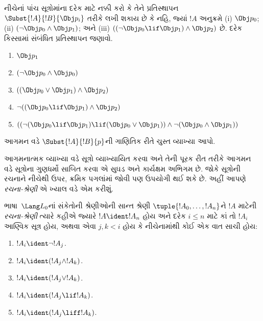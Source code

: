 \begin{prob} નીચેનાં પાંચ સૂત્રોમાંના દરેક માટે નક્કી કરો કે
 તેને પ્રતિસ્થાપન \( \Subst{!A}{!B}{\Obj p_i} \) તરીકે લખી શકાય છે કે નહિ,
 જ્યાં \( !A \) અનુક્રમે (i) \( \Obj p_0 \); (ii) \( ( \lnot \Obj p_0 \land \Obj
 p_1) \); અને (iii) \( ( ( \lnot \Obj p_0 \lif \Obj p_1 ) \land \Obj
 p_2 ) \) છે. દરેક કિસ્સામાં સંબંધિત પ્રતિસ્થાપન જણાવો.
  \begin{enumerate}
    \item \( \Obj p_1 \)
    \item \( ( \lnot \Obj p_0 \land \Obj p_0 ) \)
    \item \( ( ( \Obj p_0 \lor \Obj p_1 ) \land \Obj p_2 )  \)
    \item \( \lnot ( ( \Obj p_0 \lif \Obj p_1 ) \land \Obj p_2 ) \)
    \item \( (( \lnot ( \Obj p_0 \lif \Obj p_1 ) \lif ( \Obj p_0 \lor \Obj p_1 )) \land \lnot ( \Obj p_0 \land \Obj p_1 )) \)
  \end{enumerate}
\end{prob}

\begin{prob}
આગમન વડે $\Subst{!A}{!B}{p}$ની ગાણિતિક રીતે ચુસ્ત વ્યાખ્યા આપો.
\end{prob}
\endgroup


\begingroup
\makeatletter{}\makeatother


\label{guunit:OLP-0060}


આગમનાત્મક વ્યાખ્યા વડે સૂત્રો વ્યાખ્યાયિત કરવા અને તેની
પૂરક રીત તરીકે આગમન વડે સૂત્રોના ગુણધર્મો સાબિત કરવા એ
સુઘડ અને કાર્યક્ષમ અભિગમ છે. જોકે સૂત્રોની રચનાને નીચેથી ઉપર,
ક્રમિક પગલાંમાં જોવી પણ ઉપયોગી થઈ શકે છે. અહીં આપણે \emph{રચના-શ્રેણી}
એ ખ્યાલ વડે એમ કરીશું.

\begin{defn}[સૂત્રો માટેની રચના-શ્રેણીઓ]
ભાષા~$\Lang L_0$નાં સંકેતોની શ્રેણીઓની સાન્ત શ્રેણી
$\tuple{!A_0,\dotsc,!A_n}$ને $!A$ માટેની \emph{રચના-શ્રેણી} ત્યારે
કહીએ જ્યારે $!A \ident !A_n$ હોય અને દરેક $i\leq n$ માટે કાં તો
$!A_i$ આણ્વિક સૂત્ર હોય, અથવા એવા $j,k<i$ હોય કે નીચેનામાંથી કોઈ
એક વાત સાચી હોય:
\begin{enumerate}
    \item $!A_i \ident \lnot !A_j$.%
    \item $!A_i \ident (!A_j \land !A_k)$.%
    \item $!A_i \ident (!A_j \lor !A_k)$.%
    \item $!A_i \ident (!A_j \lif !A_k)$.%
    \item $!A_i \ident (!A_j \liff !A_k)$.%
\end{enumerate}
\end{defn}

